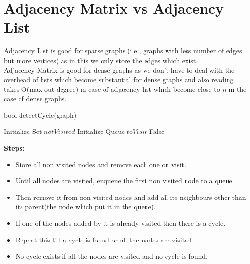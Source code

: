 \documentclass{article}
\begin{document}
\section{Adjacency Matrix vs Adjacency List}
\label{sec:3}

Adjacency List is good for sparse graphs (i.e., graphs with less number of edges but more vertices) as in this we only store the edges which exist.\\

Adjacency Matrix is good for dense graphs as we don't have to deal with the overhead of lists which become substantial for dense graphs and also reading takes O(max out degree) in case of adjacency list which become close to $n$ in the case of dense graphs.

\begin{algorithm}
  \caption{bool detectCycle(graph)}\label{alg:3}
  \DontPrintSemicolon
  Initialize Set $notVisited$\;
  Initialize Queue $toVisit$\;
  \Return False
\end{algorithm}
\textbf{Steps:}
\begin{itemize}
\item Store all non visited nodes and remove each one on visit.
\item Until all nodes are visited, enqueue the first non visited node to a queue.
\item Then remove it from non visited nodes and add all its neighbours other than its parent(the node which put it in the queue).
\item If one of the nodes added by it is already visited then there is a cycle.
\item Repeat this till a cycle is found or all the nodes are visited.
\item No cycle exists if all the nodes are visited and no cycle is found.
\end{itemize}
\end{document}
